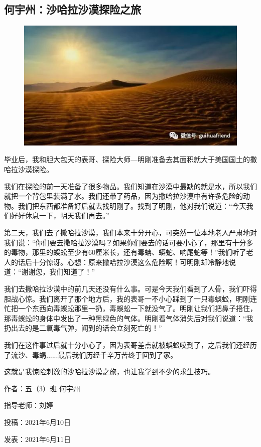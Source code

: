 \vspace{10pt}

{\centering\subsection*{何宇州：沙哈拉沙漠探险之旅}}


\renewcommand{\leftmark}{何宇州：沙哈拉沙漠探险之旅}

\begin{figure}[htbp]

\centering

\includegraphics[width = .5\textwidth]{./ch/5.jpg}

\end{figure}



毕业后，我和胆大包天的表哥、探险大师—明刚准备去其面积就大于美国国土的撒哈拉沙漠探险。

我们在探险的前一天准备了很多物品。我们知道在沙漠中最缺的就是水，所以我们就把一个背包里装满了水。我们还带了药品，因为撒哈拉沙漠中有许多危险的动物。我们把东西都准备好后就去找明刚了。找到了明刚，他对我们说道：“今天我们好好休息一下，明天我们再去。”

第二天，我们去了撒哈拉沙漠，我们本来十分开心，可突然一位本地老人严肃地对我们说：“你们要去撒哈拉沙漠吗？如果你们要去的话可要小心了，那里有十分多的毒物，那里的蜈蚣至少有60厘米长，还有毒蚺、蟒蛇、响尾蛇等！”我们听了老人的话后十分惊讶。心想：原来撒哈拉沙漠这么危险啊！可明刚却冷静地说道：“谢谢您，我们知道了！”

我们去撒哈拉沙漠中的前几天还没有什么事。可是今天我们看到了人骨，我们吓得胆战心惊。我们离开了那个地方后，我的表哥一不小心踩到了一只毒蜈蚣，明刚连忙把一个东西向毒蜈蚣那里一扔，毒蜈蚣一下就没气了。明刚让我们把鼻子捂住，那毒蜈蚣的身体中发出了一种黑绿色的气体。明刚看气体消失后对我们说道：“我扔出去的是二氧毒气弹，闻到的话会立刻死亡的！”

我们在这件事过后就十分小心了，因为表哥差点就被蜈蚣咬到了，之后我们还经历了流沙、毒蝎......最后我们历经千辛万苦终于回到了家。

这就是我惊险刺激的沙哈拉沙漠之旅，也让我学到不少的求生技巧。





\vspace{10pt}



作者：五（3）班 何宇州



指导老师：刘婷



投稿：2021年6月10日



发表：2021年6月11日






                



\vspace{10pt}

\hline



